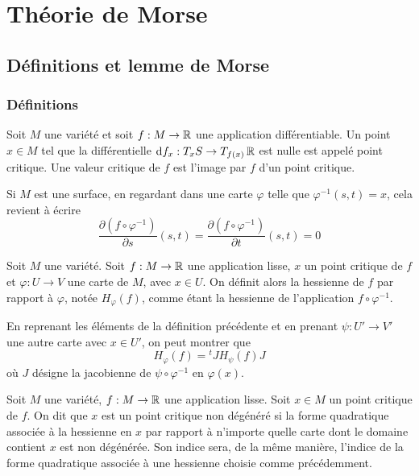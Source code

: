 \section{Théorie de Morse}

\subsection{Définitions et lemme de Morse}

\subsubsection{Définitions}
\begin{defi}
    Soit $M$ une variété et soit $f:M\to\operatorname{\mathbb R}$ une application différentiable.
    Un point $x\in M$ tel que la différentielle $\operatorname{d}\hskip-1.5pt f_x:T_xS\to T_{f(x)}\operatorname{\mathbb R}$ 
    est nulle est appelé point critique. Une valeur critique de $f$ est 
    l'image par $f$ d'un point critique.
\end{defi}

Si $M$ est une surface, en regardant dans une carte $\varphi$ telle que $\varphi^{-1}(s,t)=x$, 
cela revient à écrire 
\[
    \frac{\partial(f\circ\varphi^{-1})}{\partial s}(s,t)=
    \frac{\partial(f\circ\varphi^{-1})}{\partial t}(s,t)=0
\]

\begin{defi}
    Soit $M$ une variété.
    Soit $f:M\to \operatorname{\mathbb R}$ une application lisse, $x$ un point critique de $f$ et $\varphi:U\to V$ 
    une carte de $M$, avec $x\in U$. 
    On définit alors la hessienne de $f$ par rapport à $\varphi$, notée $H_\varphi(f)$, comme 
    étant la hessienne de l'application $f\circ\varphi^{-1}$. 
\end{defi}

\begin{remark}
    En reprenant les éléments de la définition précédente et en prenant $\psi:U'\to V'$ une 
    autre carte avec $x\in U'$, on peut montrer que 
    \[
        H_\varphi(f)={}^tJH_\psi(f)J
    \]
    où $J$ désigne la jacobienne de $\psi\circ\varphi^{-1}$ en $\varphi(x)$.
\end{remark}

\begin{defi}
    Soit $M$ une variété, $f:M\to \operatorname{\mathbb R}$ une application lisse.
    Soit $x\in M$ un point critique de $f$. 
    On dit que $x$ est un point critique non dégénéré si la forme quadratique associée 
    à la hessienne en $x$ par rapport à n'importe quelle carte dont le domaine contient 
    $x$ est non dégénérée. 
    Son indice sera, de la même manière, l'indice de la forme quadratique associée à une
    hessienne choisie comme précédemment.
\end{defi}

